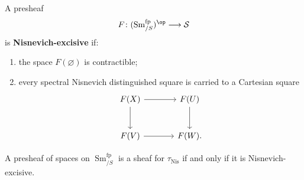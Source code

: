 \begin{definition}
\label{def:nisnevich-excisive-presheaf}
A presheaf
\[
    F
    \colon
    (\operatorname{Sm}^{\mathrm{fp}}_{/S})^{\op}
    \longrightarrow
    \mathcal S
\]
is \textbf{Nisnevich-excisive} if:
\begin{enumerate}[label=(\roman*)]
    \item the space $F(\varnothing)$ is contractible;

    \item every spectral Nisnevich distinguished square is carried to a
    Cartesian square
    \[
    \begin{tikzcd}[column sep=large, row sep=large]
        F(X)
            \arrow[r]
            \arrow[d]
        &
        F(U)
            \arrow[d]
        \\
        F(V)
            \arrow[r]
        &
        F(W).
    \end{tikzcd}
    \]
\end{enumerate}
\end{definition}

\begin{theorem}
\label{thm:nisnevich-excision-criterion}
A presheaf of spaces on $\operatorname{Sm}^{\mathrm{fp}}_{/S}$ is a sheaf
for $\tau_{\mathrm{Nis}}$ if and only if it is Nisnevich-excisive.
\end{theorem}

